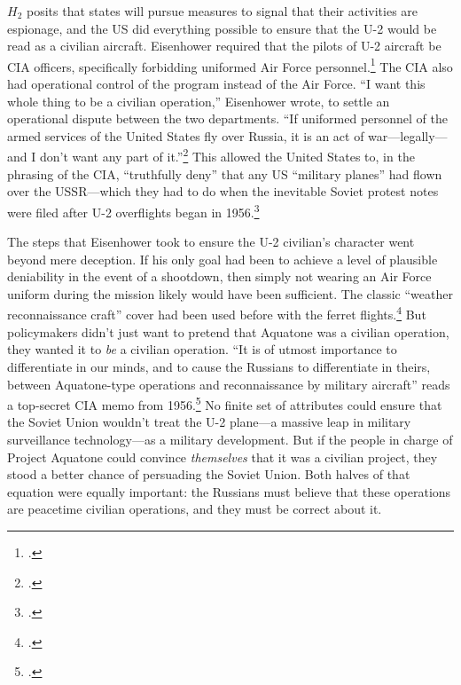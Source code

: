 \documentclass[12pt]{extarticle}
\begin{document}
$H_2$ posits that states will pursue measures to signal that their activities are espionage, and the US did everything possible to ensure that the U-2 would be read as a civilian aircraft. Eisenhower required that the pilots of U-2 aircraft be CIA officers, specifically forbidding uniformed Air Force personnel.\footcite[33, Though many of the pilots did have Air Force backgrounds.]{lindgren_trust_2000} The CIA also had operational control of the program instead of the Air Force. \enquote{I want this whole thing to be a civilian operation,} Eisenhower wrote, to settle an operational dispute between the two departments. \enquote{If uniformed personnel of the armed services of the United States fly over Russia, it is an act of war---legally---and I don't want any part of it.}\footcite[60. The original source for this quote is an \emph{OSA History} that requires codeword clearance. It is quoted here by the History Staff of the CIA.]{pedlow_central_1992} This allowed the United States to, in the phrasing of the CIA, \enquote{truthfully deny} that any US \enquote{military planes} had flown over the USSR---which they had to do when the inevitable Soviet protest notes were filed after U-2 overflights began in 1956.\footcite[109]{pedlow_central_1992}

The steps that Eisenhower took to ensure the U-2 civilian's character went beyond mere deception. If his only goal had been to achieve a level of plausible deniability in the event of a shootdown, then simply not wearing an Air Force uniform during the mission likely would have been sufficient. The classic \enquote{weather reconnaissance craft} cover had been used before with the ferret flights.\footcite[45]{farquhar_aerial_2015} But policymakers didn't just want to pretend that Aquatone was a civilian operation, they wanted it to \emph{be} a civilian operation. \enquote{It is of utmost importance to differentiate in our minds, and to cause the Russians to differentiate in theirs, between Aquatone-type operations and reconnaissance by military aircraft} reads a top-secret CIA memo from 1956.\footcite[1]{miller_suggestions_1956} No finite set of attributes could ensure that the Soviet Union wouldn't treat the U-2 plane---a massive leap in military surveillance technology---as a military development. But if the people in charge of Project Aquatone could convince \emph{themselves} that it was a civilian project, they stood a better chance of persuading the Soviet Union. Both halves of that equation were equally important: the Russians must believe that these operations are peacetime civilian operations, and they must be correct about it.
\end{document}
